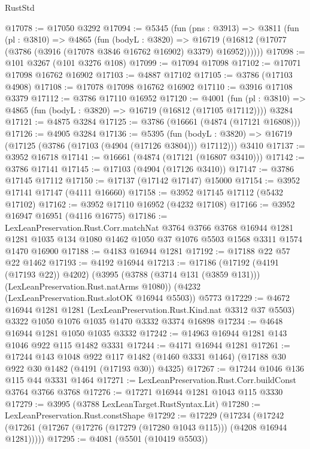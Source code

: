 \begin{lexlean}{RustStd}
\begin{coremodule}
@17078 := @17050 @3292
@17094 := @5345
    (fun (pns : @3913) =>
    @3811
      (fun (pl : @3810) =>
      @4865
        (fun (bodyL : @3820) =>
        @16719 (@16812 (@17077 (@3786 (@3916 (@17078 @3846 @16762 @16902) @3379) @16952))))))
@17098 := @101 @3267 (@101 @3276 @108)
@17099 := @17094 @17098
@17102 := @17071 @17098 @16762 @16902
@17103 := @4887 @17102
@17105 := @3786 (@17103 @4908)
@17108 := @17078 @17098 @16762 @16902
@17110 := @3916 @17108 @3379
@17112 := @3786 @17110 @16952
@17120 := @4001
    (fun (pl : @3810) => @4865 (fun (bodyL : @3820) => @16719 (@16812 (@17105 @17112))))
    @3284
@17121 := @4875 @3284
@17125 := @3786 (@16661 (@4874 (@17121 @16808)))
@17126 := @4905 @3284
@17136 := @5395
    (fun (bodyL : @3820) => @16719 (@17125 (@3786 (@17103 (@4904 (@17126 @3804))) @17112)))
    @3410
@17137 := @3952 @16718
@17141 := @16661 (@4874 (@17121 (@16807 @3410)))
@17142 := @3786 @17141
@17145 := @17103 (@4904 (@17126 @3410))
@17147 := @3786 @17145 @17112
@17150 := @17137 (@17142 @17147) @15000
@17154 := @3952 @17141 @17147 (@4111 @16660)
@17158 := @3952 @17145 @17112 (@5432 @17102)
@17162 := @3952 @17110 @16952 (@4232 @17108)
@17166 := @3952 @16947 @16951 (@4116 @16775)
@17186 := LexLeanPreservation.Rust.Corr.matchNat
    @3764
    @3766
    @3768
    @16944
    @1281
    @1281
    @1035
    @134
    @1080
    @1462
    @1050
    @37
    @1076
    @5503
    @1568
    @3311
    @1574
    @1470
    @16900
@17188 := @4183 @16944 @1281
@17192 := @17188 @22 @57 @22 @1462
@17193 := @4192 @16944
@17213 := @17186
    (@17192 (@4191 (@17193 @22)) @4202)
    (@3995 (@3788 (@3714 @131 (@3859 @131))) (LexLeanPreservation.Rust.natArms @1080))
    (@4232 (LexLeanPreservation.Rust.slotOK @16944 @5503))
    @5773
@17229 := @4672
    @16944
    @1281
    @1281
    (LexLeanPreservation.Rust.Kind.nat @3312 @37 @5503)
    @3322
    @1050
    @1076
    @1035
    @1470
    @3332
    @3374
    @16898
@17234 := @4648 @16944 @1281 @1050 @1035 @3332
@17242 := @14963 @16944 @1281 @143 @1046 @922 @115 @1482 @3331
@17244 := @4171 @16944 @1281
@17261 := @17244
    @143
    @1048
    @922
    @117
    @1482
    (@1460 @3331 @1464)
    (@17188 @30 @922 @30 @1482 (@4191 (@17193 @30)) @4325)
@17267 := @17244 @1046 @136 @115 @44 @3331 @1464
@17271 := LexLeanPreservation.Rust.Corr.buildConst @3764 @3766 @3768
@17276 := @17271 @16944 @1281 @1043 @115 @3330
@17279 := @3995 (@3788 LexLeanTarget.RustSyntax.Lit)
@17280 := LexLeanPreservation.Rust.constShape
@17292 := @17229
    (@17234 (@17242 (@17261 (@17267 (@17276 (@17279 (@17280 @1043 @115))) (@4208 @16944 @1281)))))
@17295 := @4081 (@5501 (@10419 @5503))

\end{coremodule}
\end{lexlean}
